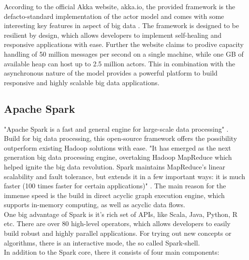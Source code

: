 According to the official Akka website, akka.io, the provided framework is the defacto-standard implementation of the actor model and comes with some interesting key features in aspect of big data \cite{akka_web}.
The framework is designed to be resilient by design, which allows developers to implement self-healing and responsive applications with ease.
Further the website claims to prodive capacity handling of 50 million messages per second on a single machine, while one GB of available heap can host up to 2.5 million actors.
This in combination with the asynchronous nature of the model provides a powerful platform to build responsive and highly scalable big data applications.


\subsection{Apache Spark}
"Apache Spark is a fast and general engine for large-scale data processing" \cite{apache_spark}. \\
Build for big data processing, this open-source framework offers the possibility outperform existing Hadoop solutions with ease.
"It has emerged as the next generation big data processing engine, overtaking Hadoop MapReduce which helped ignite the big data revolution.
Spark maintains MapReduce's linear scalability and fault tolerance, but extends it in a few important ways: it is much faster (100 times faster for certain applications)" \cite{shanahan2015large}.
The main reason for the immense speed is the build in direct acyclic graph execution engine, which supports in-memory computing, as well as acyclic data flows.\\

One big advantage of Spark is it's rich set of APIs, like Scala, Java, Python, R etc.
There are over 80 high-level operators, which allows developers to easily build robust and highly parallel applications.
For trying out new concepts or algorithms, there is an interactive mode, the so called Spark-shell. \\

In addition to the Spark core, there it consists of four main components:

